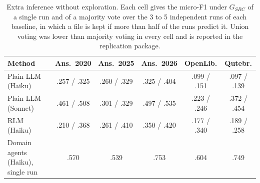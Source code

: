 \begin{table}[t]
\centering
\caption{Extra inference without exploration. Each cell gives the micro-F1 under $G_{SRC}$ of a single run and of a majority vote over the 3 to 5 independent runs of each baseline, in which a file is kept if more than half of the runs predict it. Union voting was lower than majority voting in every cell and is reported in the replication package.}
\label{tab:ensemble}
\small
\begin{tabular}{lccccc}
\toprule
Method & Ans.\ 2020 & Ans.\ 2025 & Ans.\ 2026 & OpenLib. & Qutebr. \\
\midrule
Plain LLM (Haiku) & .257 / .325 & .260 / .329 & .325 / .404 & .099 / .151 & .097 / .139 \\
Plain LLM (Sonnet) & .461 / .508 & .301 / .329 & .497 / .535 & .223 / .246 & .372 / .454 \\
RLM (Haiku) & .210 / .368 & .261 / .410 & .350 / .420 & .177 / .340 & .189 / .258 \\
\midrule
Domain agents (Haiku), single run & .570 & .539 & .753 & .604 & .749 \\
\bottomrule
\end{tabular}
\end{table}
